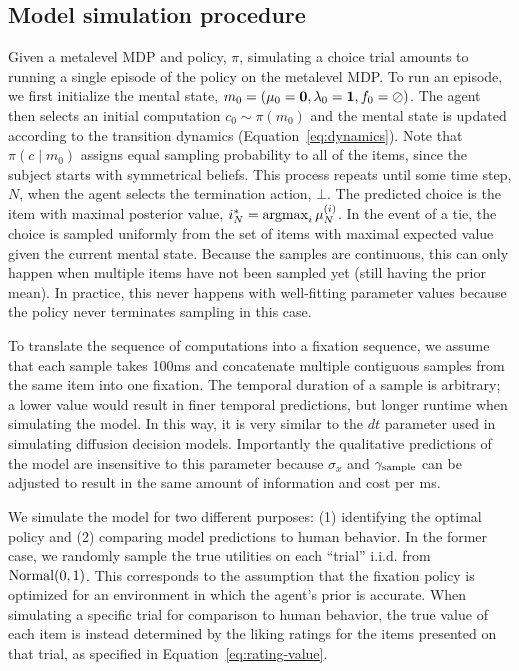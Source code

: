 \subsection{Model simulation procedure}

Given a metalevel MDP and policy, $\pi$, simulating a choice trial amounts to running a single episode of the policy on the metalevel MDP. To run an episode, we first initialize the mental state, $m_0 = (\mathbf{\mu}_0 = \mathbf{0}, \mathbf{\lambda}_0 = \mathbf{1}, f_0 = \oslash)$. The agent then selects an initial computation $c_{0}\sim\pi(m_{0})$ and the mental state is updated according to the transition dynamics (Equation~\ref{eq:dynamics}). Note that $\pi(c \mid m_{0})$ assigns equal sampling probability to all of the items, since the subject starts with symmetrical beliefs. This process repeats until some time step, $N$, when the agent selects the termination action, $\bot$. The predicted choice is the item with maximal posterior value, $i^*_N = \operatorname*{argmax}_{i} \mu_N^{(i)}$. In the event of a tie, the choice is sampled uniformly from the set of items with maximal expected value given the current mental state. Because the samples are continuous, this can only happen when multiple items have not been sampled yet (still having the prior mean). In practice, this never happens with well-fitting parameter values because the policy never terminates sampling in this case.

To translate the sequence of computations into a fixation sequence, we assume that each sample takes 100ms and concatenate multiple contiguous samples from the same item into one fixation. The temporal duration of a sample is arbitrary; a lower value would result in finer temporal predictions, but longer runtime when simulating the model. In this way, it is very similar to the $dt$ parameter used in simulating diffusion decision models. Importantly the qualitative predictions of the model are insensitive to this parameter because $\sigma_x$ and $\gamma_\text{sample}$ can be adjusted to result in the same amount of information and cost per ms. 

We simulate the model for two different purposes: (1) identifying the optimal policy and (2) comparing model predictions to human behavior. In the former case, we randomly sample the true utilities on each ``trial'' i.i.d. from $\mathrm{Normal}(0,1)$. This corresponds to the assumption that the fixation policy is optimized for an environment in which the agent's prior is accurate. When simulating a specific trial for comparison to human behavior, the true value of each item is instead determined by the liking ratings for the items presented on that trial, as specified in Equation~\ref{eq:rating-value}.


